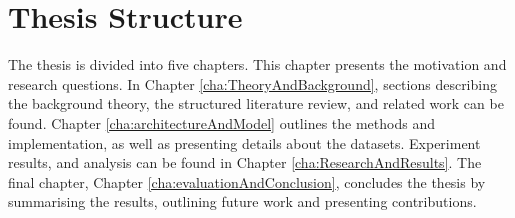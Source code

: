 \section{Thesis Structure}
\label{sec:thesisStructure}
The thesis is divided into five chapters. This chapter presents the motivation and research questions. In Chapter \ref{cha:TheoryAndBackground}, sections describing the background theory, the structured literature review, and related work can be found. Chapter \ref{cha:architectureAndModel} outlines the methods and implementation, as well as presenting details about the datasets. Experiment results, and analysis can be found in Chapter \ref{cha:ResearchAndResults}. The final chapter, Chapter \ref{cha:evaluationAndConclusion}, concludes the thesis by summarising the results, outlining future work and presenting contributions.